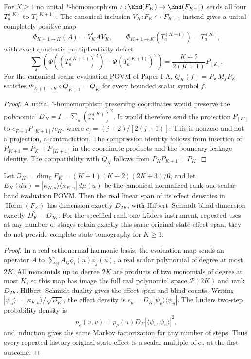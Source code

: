 \documentclass[12pt,a4paper]{article}
\begin{document}
\begin{proposition}
\label{p2c:prop:research-v13-toeplitz-UCP-nesting}
For $K\ge1$ no unital $*$-homomorphism
$\iota:\End(F_K)\to\End(F_{K+1})$ sends all four $T_a^{(K)}$
to $T_a^{(K+1)}$. The canonical inclusion
$V_K:F_K\hookrightarrow F_{K+1}$ instead gives a unital
completely positive map
\[
 \Phi_{K+1\to K}(A)=V_K^*AV_K,
 \qquad \Phi_{K+1\to K}(T_a^{(K+1)})=T_a^{(K)},
\]
with exact quadratic multiplicativity defect
\[
 \sum_a\left(\Phi((T_a^{(K+1)})^2)-\Phi(T_a^{(K+1)})^2\right)
 =\frac{K+2}{2(K+1)}P_{[K]}.
\]
For the canonical scalar evaluation POVM of Paper I-A,
$Q_K(f)=P_KM_fP_K$ satisfies
$\Phi_{K+1\to K}\circ Q_{K+1}=Q_K$ for every bounded
scalar symbol $f$.
\end{proposition}
\begin{proof}
A unital $*$-homomorphism preserving coordinates would preserve the
polynomial $D_K=I-\sum_a(T_a^{(K)})^2$. It would therefore send the
projection $P_{[K]}$ to
$c_{K+1}P_{[K+1]}/c_K$, where
$c_j=(j+2)/[2(j+1)]$. This is nonzero and not a projection,
a contradiction. The compression identity follows from insertion
of $P_{K+1}=P_K+P_{[K+1]}$ in the coordinate products and the
boundary leakage identity. The compatibility with $Q_K$ follows
from $P_KP_{K+1}=P_K$.
\end{proof}

\begin{theorem}
\label{p2c:thm:research-v13-evaluation-effect-rank}
Let $D_K=\dim_{\mathbb C}F_K=(K+1)(K+2)(2K+3)/6$, and let
$E_K(du)=|\kappa_{K,u}\rangle\langle\kappa_{K,u}|\,d\mu(u)$
be the canonical normalized rank-one scalar-band evaluation POVM.
Then the real linear span of its effect densities in
$\operatorname{Herm}(F_K)$ has dimension exactly $D_{2K}$, with
Hilbert--Schmidt blind dimension exactly $D_K^2-D_{2K}$.
For the specified rank-one L\"uders instrument, repeated uses at
any number of stages retain exactly this same original-state effect
span; they do not provide complete state tomography for $K\ge1$.
\end{theorem}
\begin{proof}
In a real orthonormal harmonic basis, the evaluation map sends an
operator $A$ to $\sum_{ij}A_{ij}\phi_i(u)\phi_j(u)$, a real scalar
polynomial of degree at most $2K$. All monomials up to degree $2K$
are products of two monomials of degree at most $K$, so this map has
image the full real polynomial space $\mathcal P(2K)$ and rank
$D_{2K}$. Hilbert--Schmidt duality gives the effect-span and blind
counts. Writing $|\psi_u\rangle=|\kappa_{K,u}\rangle/\sqrt{D_K}$,
the effect density is $e_u=D_K|\psi_u\rangle\langle\psi_u|$.
The L\"uders two-step probability density is
\[
 p_\rho(u,v)=p_\rho(u)D_K|\langle\psi_v,\psi_u\rangle|^2,
\]
and induction gives the same Markov factorization for any number
of steps. Thus every repeated-history original-state effect is a
scalar multiple of $e_u$ at the first outcome.
\end{proof}
\end{document}
